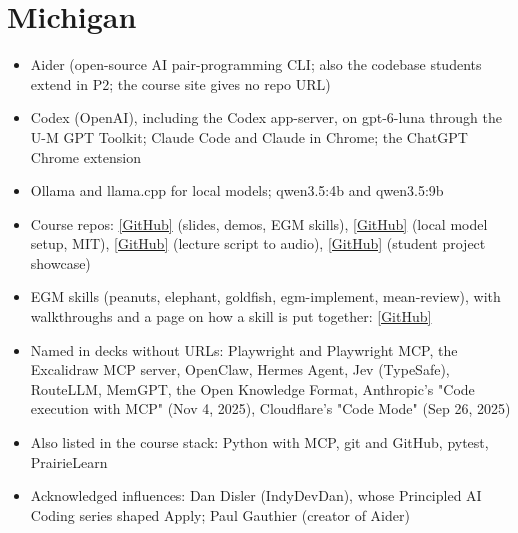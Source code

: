 \documentclass[10pt,oneside]{report}
\begin{document}
\section{Michigan}
{\small\begin{itemize}
\item Aider (open-source AI pair-programming CLI; also the codebase students extend in P2; the course site gives no repo URL)
\item Codex (OpenAI), including the Codex app-server, on gpt-6-luna through the U-M GPT Toolkit; Claude Code and Claude in Chrome; the ChatGPT Chrome extension
\item Ollama and llama.cpp for local models; qwen3.5:4b and qwen3.5:9b
\item Course repos: \href{https://github.com/eecs498-aase/materials}{[GitHub]} (slides, demos, EGM skills), \href{https://github.com/eecs498-aase/aider-ollama}{[GitHub]} (local model setup, MIT), \href{https://github.com/eecs498-aase/lecture-tts}{[GitHub]} (lecture script to audio), \href{https://github.com/eecs498-aase/showcase}{[GitHub]} (student project showcase)
\item EGM skills (peanuts, elephant, goldfish, egm-implement, mean-review), with walkthroughs and a page on how a skill is put together: \href{https://github.com/eecs498-aase/materials/tree/main/egm}{[GitHub]}
\item Named in decks without URLs: Playwright and Playwright MCP, the Excalidraw MCP server, OpenClaw, Hermes Agent, Jev (TypeSafe), RouteLLM, MemGPT, the Open Knowledge Format, Anthropic's "Code execution with MCP" (Nov 4, 2025), Cloudflare's "Code Mode" (Sep 26, 2025)
\item Also listed in the course stack: Python with MCP, git and GitHub, pytest, PrairieLearn
\item Acknowledged influences: Dan Disler (IndyDevDan), whose Principled AI Coding series shaped Apply; Paul Gauthier (creator of Aider)
\end{itemize}}
\end{document}
